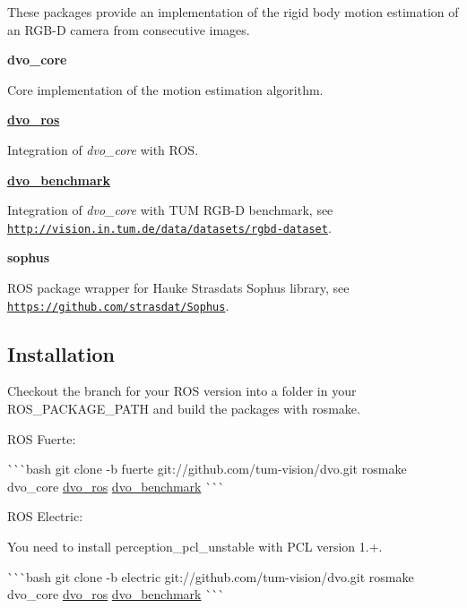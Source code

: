 These packages provide an implementation of the rigid body motion estimation of an R\+G\+B-\/D camera from consecutive images.


\begin{DoxyItemize}
\item {\bfseries dvo\+\_\+core}

Core implementation of the motion estimation algorithm.
\item {\bfseries \mbox{\hyperlink{namespacedvo__ros}{dvo\+\_\+ros}}}

Integration of {\itshape dvo\+\_\+core} with R\+OS.
\item {\bfseries \mbox{\hyperlink{namespacedvo__benchmark}{dvo\+\_\+benchmark}}}

Integration of {\itshape dvo\+\_\+core} with T\+UM R\+G\+B-\/D benchmark, see \href{http://vision.in.tum.de/data/datasets/rgbd-dataset}{\tt http\+://vision.\+in.\+tum.\+de/data/datasets/rgbd-\/dataset}.
\item {\bfseries sophus}

R\+OS package wrapper for Hauke Strasdat\textquotesingle{}s Sophus library, see \href{https://github.com/strasdat/Sophus}{\tt https\+://github.\+com/strasdat/\+Sophus}.
\end{DoxyItemize}

\subsection*{Installation}

Checkout the branch for your R\+OS version into a folder in your {\ttfamily R\+O\+S\+\_\+\+P\+A\+C\+K\+A\+G\+E\+\_\+\+P\+A\+TH} and build the packages with {\ttfamily rosmake}.


\begin{DoxyItemize}
\item R\+OS Fuerte\+:

\`{}\`{}\`{}bash git clone -\/b fuerte git\+://github.com/tum-\/vision/dvo.\+git rosmake dvo\+\_\+core \mbox{\hyperlink{namespacedvo__ros}{dvo\+\_\+ros}} \mbox{\hyperlink{namespacedvo__benchmark}{dvo\+\_\+benchmark}} \`{}\`{}\`{}
\item R\+OS Electric\+:

You need to install {\ttfamily perception\+\_\+pcl\+\_\+unstable} with P\+CL version 1.+.

\`{}\`{}\`{}bash git clone -\/b electric git\+://github.com/tum-\/vision/dvo.\+git rosmake dvo\+\_\+core \mbox{\hyperlink{namespacedvo__ros}{dvo\+\_\+ros}} \mbox{\hyperlink{namespacedvo__benchmark}{dvo\+\_\+benchmark}} \`{}\`{}\`{}
\end{DoxyItemize}

